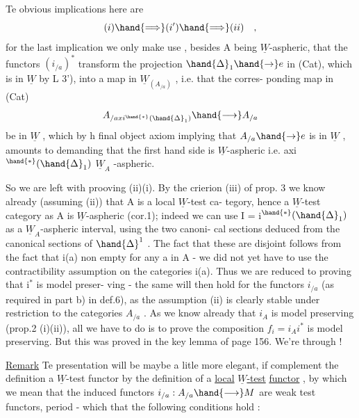 
Te obvious implications here are
\[ (i)\hand{\Longrightarrow}(i')\hand{\Longrightarrow}(ii) \quad , \]
for the last implication we only make use , besides A being $\underline{W}$-aspheric,
that the functors $(i_{/a})^*$ transform the projection $\hand{\Delta}_1 \hand{\to} e$ in (Cat),
which is in $\underline{W}$ by L 3'), into a map in $\underline{W}_{(A_{/a})}$ , i.e. that the corres-%
ponding map in (Cat)
\[ A_{/axi^{\hand{*}}(\hand{\Delta}_1)} \hand{\longrightarrow} A_{/a} \]
be in $\underline{W}$ , which by h final object axiom implying that $A_{/a}\hand{\to} e$ is in
$\underline{W}$ , amounts to demanding that the first hand side is $\underline{W}$-aspheric i.e.
axi$^{\hand{*}}(\hand{\Delta}_1)$ $\underline{W}_A$ -aspheric.

So we are left with prooving (ii)\hand{$\Rightarrow$}(i). By the crierion (iii)
of prop. 3 we know already (assuming (ii)) that A is a local $\underline{W}$-test ca-%
tegory, hence a $\underline{W}$-test category as A is $\underline{W}$-aspheric (cor.1); indeed
we can use I = i$^{\hand{*}}(\hand{\Delta}_1)$ as a $\underline{W}_A$-aspheric interval, using the two canoni-%
cal sections deduced from the canonical sections of $\hand{\Delta}^1$ . The fact that
these are disjoint follows from the fact that i(a) non empty for any a in
A - we did not yet have to use the contractibility assumption on the
categories i(a). Thus we are reduced to proving that i$^*$ is model preser-%
ving - the same will then hold for the functors $i_{/a}$ (as required in
part b) in def.6), as the assumption (ii) is clearly stable under 
restriction to the categories $A_{/a}$ . As we know already that $i_A$ is
model preserving (prop.2 (i)\hand{$\Rightarrow$}(ii)), all we have to do is to prove the
composition $f_i = i_A i^*$ is model preserving. But this was proved  in the
key lemma of page 156. We're through !

\uline{Remark} Te presentation will be maybe a litle more elegant, if 
complement the definition  a $\underline{W}$-test functor by the definition of a
\uline{local} \uline{$\underline{W}$-test} \uline{functor} , by which we mean that the induced functors
$i_{/a} : A_{/a} \hand{\longrightarrow} M$ are weak test functors, period - which  
 that the following conditions hold :

